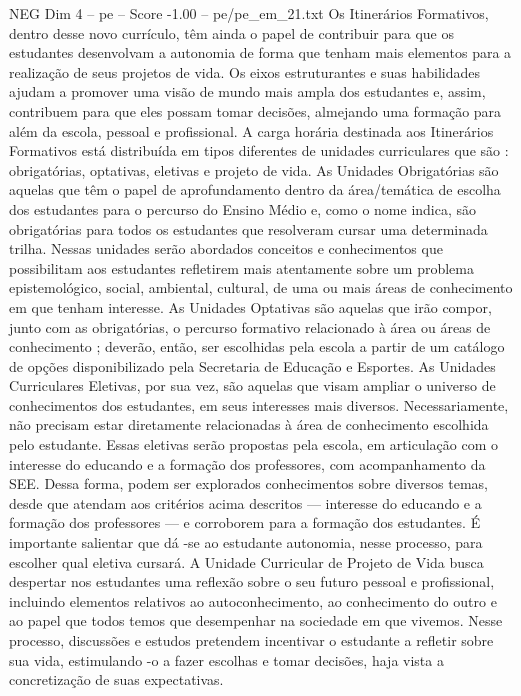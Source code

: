 \begin{textsample}{NEG Dim 4 – pe – Score -1.00 – pe/pe\_em\_21.txt}
Os Itinerários Formativos, dentro desse novo currículo, têm ainda o papel de contribuir para que os estudantes desenvolvam a autonomia de forma que tenham mais elementos para a realização de seus projetos de vida.
Os eixos estruturantes e suas habilidades ajudam a promover uma visão de mundo mais ampla dos estudantes e, assim, contribuem para que eles possam tomar decisões, almejando uma formação para além da escola, pessoal e profissional.
A carga horária destinada aos Itinerários Formativos está distribuída em tipos diferentes de unidades curriculares que são : obrigatórias, optativas, eletivas e projeto de vida.
As Unidades Obrigatórias são aquelas que têm o papel de aprofundamento dentro da área/temática de escolha dos estudantes para o percurso do Ensino Médio e, como o nome indica, são obrigatórias para todos os estudantes que resolveram cursar uma determinada trilha.
Nessas unidades serão abordados conceitos e conhecimentos que possibilitam aos estudantes refletirem mais atentamente sobre um problema epistemológico, social, ambiental, cultural, de uma ou mais áreas de conhecimento em que tenham interesse.
As Unidades Optativas são aquelas que irão compor, junto com as obrigatórias, o percurso formativo relacionado à área ou áreas de conhecimento ; deverão, então, ser escolhidas pela escola a partir de um catálogo de opções disponibilizado pela Secretaria de Educação e Esportes.
As Unidades Curriculares Eletivas, por sua vez, são aquelas que visam ampliar o universo de conhecimentos dos estudantes, em seus interesses mais diversos.
Necessariamente, não precisam estar diretamente relacionadas à área de conhecimento escolhida pelo estudante.
Essas eletivas serão propostas pela escola, em articulação com o interesse do educando e a formação dos professores, com acompanhamento da SEE.
Dessa forma, podem ser explorados conhecimentos sobre diversos temas, desde que atendam aos critérios acima descritos — interesse do educando e a formação dos professores — e corroborem para a formação dos estudantes.
É importante salientar que dá -se ao estudante autonomia, nesse processo, para escolher qual eletiva cursará.
A Unidade Curricular de Projeto de Vida busca despertar nos estudantes uma reflexão sobre o seu futuro pessoal e profissional, incluindo elementos relativos ao autoconhecimento, ao conhecimento do outro e ao papel que todos temos que desempenhar na sociedade em que vivemos.
Nesse processo, discussões e estudos pretendem incentivar o estudante a refletir sobre sua vida, estimulando -o a fazer escolhas e tomar decisões, haja vista a concretização de suas expectativas.

\end{textsample}

